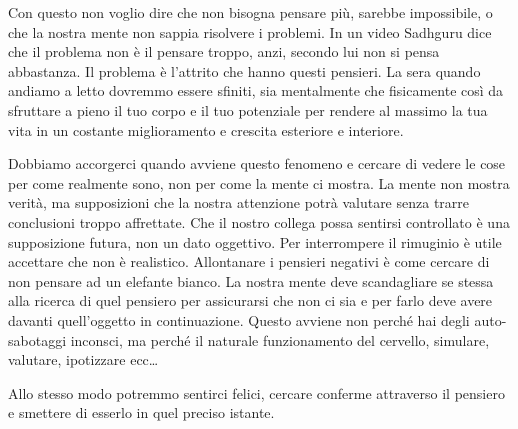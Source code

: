 \documentclass[12pt]{book} %
\begin{document}
Con questo non voglio dire che non bisogna pensare più, sarebbe impossibile, o che la nostra mente non sappia risolvere
i problemi. In un video Sadhguru dice che il problema non è il pensare troppo, anzi, secondo lui non si pensa abbastanza. Il problema è l'attrito che hanno questi pensieri. La sera quando andiamo a letto dovremmo essere sfiniti, sia mentalmente che fisicamente così da sfruttare a pieno il tuo corpo e il tuo potenziale per rendere al massimo la tua vita in un costante miglioramento e crescita esteriore e interiore.

Dobbiamo accorgerci quando avviene questo fenomeno e cercare di vedere le cose per come realmente
sono, non per come la mente ci mostra. La mente non mostra verità, ma supposizioni che la nostra attenzione potrà
valutare senza trarre conclusioni troppo affrettate. Che il nostro collega possa sentirsi controllato è una
supposizione futura, non un dato oggettivo. Per interrompere il rimuginio è utile accettare che non è realistico. Allontanare i pensieri negativi è come cercare di non pensare ad un elefante bianco. La nostra mente deve scandagliare se stessa alla ricerca di
quel pensiero per assicurarsi che non ci sia e per farlo deve avere davanti quell'oggetto in continuazione. Questo
avviene non perché hai degli auto-sabotaggi inconsci, ma perché il naturale funzionamento del cervello, simulare,
valutare, ipotizzare ecc…

Allo stesso modo potremmo sentirci felici, cercare conferme attraverso il pensiero e smettere di esserlo in quel preciso
istante. 
\end{document}
